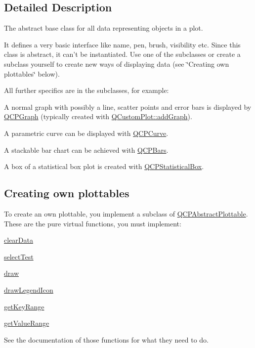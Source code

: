 \subsection{Detailed Description}
The abstract base class for all data representing objects in a plot. 

It defines a very basic interface like name, pen, brush, visibility etc. Since this class is abstract, it can't be instantiated. Use one of the subclasses or create a subclass yourself to create new ways of displaying data (see \char`\"{}\-Creating own plottables\char`\"{} below).

All further specifics are in the subclasses, for example\-: \begin{DoxyItemize}
\item A normal graph with possibly a line, scatter points and error bars is displayed by \hyperlink{class_q_c_p_graph}{Q\-C\-P\-Graph} (typically created with \hyperlink{class_q_custom_plot_a6fb2873d35a8a8089842d81a70a54167}{Q\-Custom\-Plot\-::add\-Graph}). \item A parametric curve can be displayed with \hyperlink{class_q_c_p_curve}{Q\-C\-P\-Curve}. \item A stackable bar chart can be achieved with \hyperlink{class_q_c_p_bars}{Q\-C\-P\-Bars}. \item A box of a statistical box plot is created with \hyperlink{class_q_c_p_statistical_box}{Q\-C\-P\-Statistical\-Box}.\end{DoxyItemize}
\hypertarget{class_q_c_p_abstract_plottable_plottables-subclassing}{}\subsection{Creating own plottables}\label{class_q_c_p_abstract_plottable_plottables-subclassing}
To create an own plottable, you implement a subclass of \hyperlink{class_q_c_p_abstract_plottable}{Q\-C\-P\-Abstract\-Plottable}. These are the pure virtual functions, you must implement\-: \begin{DoxyItemize}
\item \hyperlink{class_q_c_p_abstract_plottable_a86e5b8fd4b6ff4f4084e7ea4c573fc53}{clear\-Data} \item \hyperlink{class_q_c_p_abstract_plottable_a38efe9641d972992a3d44204bc80ec1d}{select\-Test} \item \hyperlink{class_q_c_p_abstract_plottable_acbab5e30dcd04fd302b4a5902ac2c482}{draw} \item \hyperlink{class_q_c_p_abstract_plottable_a9a450783fd9ed539e589999fd390cdf7}{draw\-Legend\-Icon} \item \hyperlink{class_q_c_p_abstract_plottable_a7aa24ed0b3c39bd99338c7b9f145a71b}{get\-Key\-Range} \item \hyperlink{class_q_c_p_abstract_plottable_aed35cfebe5546feea7af2638dd869d5f}{get\-Value\-Range}\end{DoxyItemize}
See the documentation of those functions for what they need to do.

